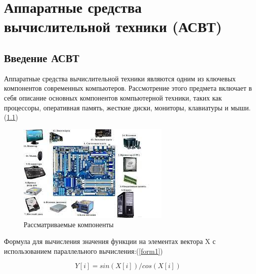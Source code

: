 \documentclass[a4paper, 14pt]{report}
\begin{document}
	\chapter{Аппаратные средства вычислительной техники (АСВТ)}
	\section{Введение АСВТ}
	Аппаратные средства вычислительной техники являются одним из ключевых компонентов современных компьютеров. Рассмотрение этого предмета включает в себя описание основных компонентов компьютерной техники, таких как процессоры, оперативная память, жесткие диски, мониторы, клавиатуры и мыши.(\ref{cuda1})
	
	\begin{figure}[h]
		\centering
		\includegraphics[scale=0.7]{cudaOne}
		\caption{Рассматриваемые компоненты}
		\label{cuda1}
	\end{figure}

	Формула для вычисления значения функции на элементах вектора X с использованием параллельного вычисления:(\ref{form1})
	
	\begin{equation}
		Y[i] = sin(X[i]) / cos(X[i])
		\label{form1}
	\end{equation}
	
	
	
	
	
\end{document}
